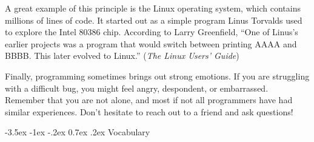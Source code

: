 \documentclass[12pt]{book}
\makeatletter
\theoremstyle{exercise}
\renewcommand{\section}{\@startsection{section}{1}{\z@}%
    {-3.5ex \@plus -1ex \@minus -.2ex}%
    {0.7ex \@plus.2ex}%
    {\normalfont\Large\bfseries}}
\makeatother
\begin{document}

A great example of this principle is the Linux operating system, which contains millions of lines of code.
It started out as a simple program Linus Torvalds used to explore the Intel 80386 chip.
According to Larry Greenfield, ``One of Linus's earlier projects was a program that would switch between printing AAAA and BBBB.
This later evolved to Linux.'' ({\em The Linux Users' Guide})


Finally, programming sometimes brings out strong emotions.
If you are struggling with a difficult bug, you might feel angry, despondent, or embarrassed.
Remember that you are not alone, and most if not all programmers have had similar experiences.
Don't hesitate to reach out to a friend and ask questions!







\section{Vocabulary}
\end{document}
